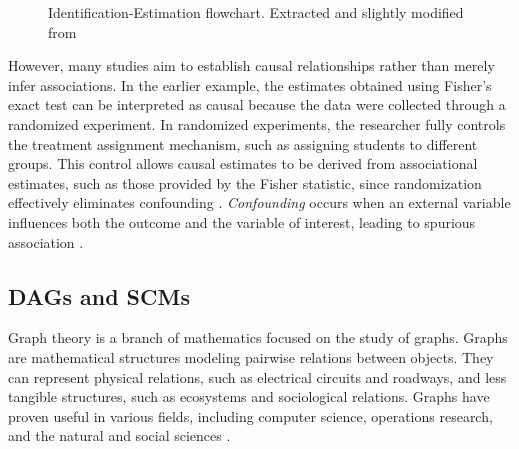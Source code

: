 \documentclass[
  authoryear,
  preprint,
  1p]{elsarticle}
\begin{document}
\begin{figure}


\caption{\label{fig-IEflow}Identification-Estimation flowchart.
Extracted and slightly modified from \citet[32]{Neal_2020}}

\end{figure}%

However, many studies aim to establish causal relationships rather than
merely infer associations. In the earlier example, the estimates
obtained using Fisher's exact test can be interpreted as causal because
the data were collected through a randomized experiment. In randomized
experiments, the researcher fully controls the treatment assignment
mechanism, such as assigning students to different groups. This control
allows causal estimates to be derived from associational estimates, such
as those provided by the Fisher statistic, since randomization
effectively eliminates confounding \citep{Neal_2020}. \emph{Confounding}
occurs when an external variable influences both the outcome and the
variable of interest, leading to spurious association
\citep{Everitt_et_al_2010}.

\subsection{DAGs and SCMs}\label{sec-framework-dag}

Graph theory is a branch of mathematics focused on the study of graphs.
Graphs are mathematical structures modeling pairwise relations between
objects. They can represent physical relations, such as electrical
circuits and roadways, and less tangible structures, such as ecosystems
and sociological relations. Graphs have proven useful in various fields,
including computer science, operations research, and the natural and
social sciences \citep{Gross_et_al_2018}.
\end{document}
